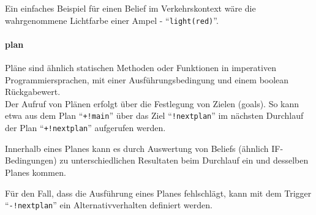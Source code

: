 Ein einfaches Beispiel für einen Belief im Verkehrskontext wäre die wahrgenommene Lichtfarbe einer Ampel - \enquote{\texttt{light(red)}}.

\paragraph*{plan}
Pläne sind ähnlich statischen Methoden oder Funktionen in imperativen Programmiersprachen, mit einer Ausführungsbedingung und einem boolean Rückgabewert.
\\
Der Aufruf von Plänen erfolgt über die Festlegung von Zielen (goals).
So kann etwa aus dem Plan \enquote{\texttt{+!main}} über das Ziel \enquote{\texttt{!nextplan}} im nächsten Durchlauf der Plan \enquote{\texttt{+!nextplan}} aufgerufen werden.

Innerhalb eines Planes kann es durch Auswertung von Beliefs (ähnlich IF-Bedingungen) zu unterschiedlichen Resultaten beim Durchlauf ein und desselben Planes kommen.

Für den Fall, dass die Ausführung eines Planes fehlschlägt, kann mit dem Trigger \enquote{\texttt{-!nextplan}} ein Alternativverhalten definiert werden.